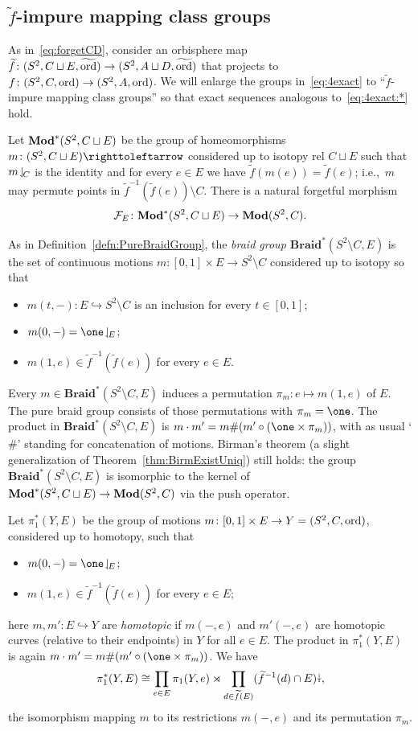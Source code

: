 \documentclass{amsart}
\newcommand\Forget{{\mathcal F}}
\newcommand\Braid{{\mathbf{Braid}}}
\newcommand\wtf{{\widetilde f}}
\newcommand\wtord{{\widetilde\ord}}
\begin{document}
\subsection{\boldmath $\wtf$-impure mapping class groups}
As in~\eqref{eq:forgetCD}, consider an orbisphere map
$\wtf\colon(S^2,C\sqcup E,\wtord)\to(S^2,A\sqcup
D,\wtord)$ that projects to
$f\colon(S^2,C,\operatorname{ord})\to(S^2,A,\operatorname{ord})$. We will enlarge the groups
in~\eqref{eq:4exact} to ``$\wtf$-impure mapping class groups'' so that
exact sequences analogous to~\eqref{eq:4exact:*} hold.

Let $\mathbf{\relax Mod}^*(S^2,C\sqcup E)$ be the group of homeomorphisms
$m\colon (S^2,C\sqcup E)\selfmap$ considered up to isotopy rel
$C\sqcup E$ such that $m\!\downharpoonleft_{\!C}$ is the identity and for every
$e\in E$ we have $\wtf(m(e))=\wtf(e)$; i.e.,~$m$ may permute points in
$\wtf^{-1}(\wtf(e))\setminus C$. There is a natural forgetful morphism
\[\Forget_E\colon \Mod^*(S^2,C\sqcup E)\to\Mod(S^2,C).\]

As in Definition~\ref{defn:PureBraidGroup}, the \emph{braid group
  $\Braid^*(S^2\setminus C,E)$} is the set of continuous motions
$m\colon[0,1]\times E\to S^2\setminus C$ considered up to isotopy so
that
\begin{itemize}
\item $m(t,-)\colon E\hookrightarrow S^2\setminus C$ is an inclusion
  for every $t\in [0,1]$;
\item $m(0,-)=\one\restrict E$;
\item $m(1,e)\in \wtf^{-1}(\wtf(e))$ for every $e\in E$.
\end{itemize}
Every $m\in\Braid^*(S^2\setminus C,E)$ induces a permutation
$\pi_m\colon e\mapsto m(1,e)$ of $E$. The pure braid group consists of
those permutations with $\pi_m=\one$. The product in
$\Braid^*(S^2\setminus C,E)$ is
$m\cdot m'=m\#(m'\circ(\one\times\pi_m))$, with as usual `$\#$'
standing for concatenation of motions. Birman's theorem (a slight
generalization of Theorem~\ref{thm:BirmExistUniq}) still holds: the
group $\Braid^*(S^2\setminus C,E)$ is isomorphic to the kernel of
$\mathbf{\relax Mod}^*(S^2,C\sqcup E)\to\mathbf{\relax Mod}(S^2,C)$ via the push operator.

Let $\pi_1^*(Y,E)$ be the group of motions
$m\colon[0,1]\times E\to Y=(S^2,C,\operatorname{ord})$, considered up to homotopy,
such that
\begin{itemize}
\item $m(0,-)=\one\restrict E$;
\item $m(1,e)\in \wtf^{-1}(\wtf(e))$  for every $e\in E$;
\end{itemize}
here $m,m'\colon E\hookrightarrow Y$ are \emph{homotopic} if $m(-,e)$
and $m'(-,e)$ are homotopic curves (relative to their endpoints) in
$Y$ for all $e\in E$.  The product in $\pi_1^*(Y,E)$ is again
$m\cdot m'=m\#(m'\circ(\one\times\pi_m))$. We have
\begin{equation}\label{eq:decompose pi_1*}
  \pi_1^*(Y,E)\cong\prod_{e\in E}\pi_1(Y,e)\rtimes\prod_{d\in\wtf(E)}(\wtf^{-1}(d)\cap E)\perm,
\end{equation}
the isomorphism mapping $m$ to its restrictions $m(-,e)$ and its
permutation $\pi_m$.
\end{document}
